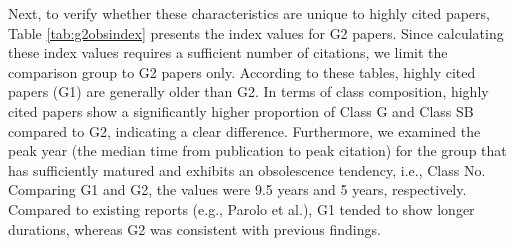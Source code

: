 Next, to verify whether these characteristics are unique to highly cited papers, Table \ref{tab:g2obsindex} presents the index values for G2 papers.
Since calculating these index values requires a sufficient number of citations, we limit the comparison group to G2 papers only.
According to these tables, highly cited papers (G1) are generally older than G2.
In terms of class composition, highly cited papers show a significantly higher proportion of Class G and Class SB compared to G2, indicating a clear difference.
Furthermore, we examined the peak year (the median time from publication to peak citation) for the group that has sufficiently matured and exhibits an obsolescence tendency, i.e., Class No. Comparing G1 and G2, the values were 9.5 years and 5 years, respectively. Compared to existing reports (e.g., Parolo et al.), G1 tended to show longer durations, whereas G2 was consistent with previous findings.

